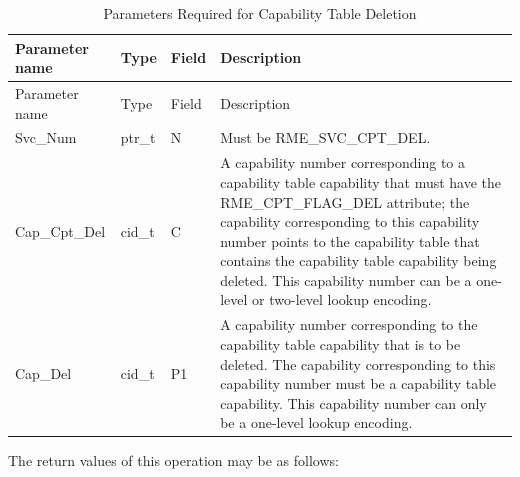\begin{xltabular}{\textwidth}{@{}>{\hsize\raggedright\arraybackslash}X>{\hsize\raggedright\arraybackslash}X>{\hsize\raggedright\arraybackslash}X>{\hsize\raggedright\arraybackslash}X@{}}
\caption{Parameters Required for Capability Table Deletion}\label{tab:2-7-delete-capability-table-parameters}\\
\toprule
Parameter name & Type & Field & Description\tabularnewline
\endfirsthead
\toprule
Parameter name & Type & Field & Description\tabularnewline
\midrule
\endhead
\bottomrule
\endlastfoot
Svc\_Num & ptr\_t & N & Must be RME\_SVC\_CPT\_DEL.\tabularnewline
Cap\_Cpt\_Del & cid\_t & C &
A capability number corresponding to a capability table capability that must have the RME\_CPT\_FLAG\_DEL attribute; the capability corresponding to this capability number points to the capability table that contains the capability table capability being deleted. This capability number can be a one-level or two-level lookup encoding.\tabularnewline
Cap\_Del & cid\_t & P1 &
A capability number corresponding to the capability table capability that is to be deleted. The capability corresponding to this capability number must be a capability table capability. This capability number can only be a one-level lookup encoding.\tabularnewline
\end{xltabular}
\nopagebreak[4]

The return values of this operation may be as follows:

